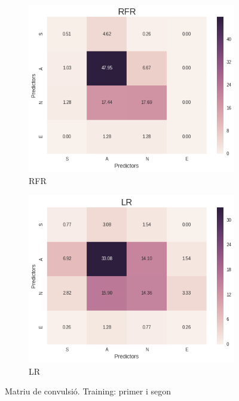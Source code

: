 \documentclass[12pt,a4paper,catalan]{article}
\begin{document}
\begin{figure}[h]
\centering
\begin{subfigure}{.42\textwidth}
  \centering
  \includegraphics[width=\linewidth]{img/heatmap_rfr_primersegon_tercer.png}
  \caption{RFR}
\end{subfigure}
\begin{subfigure}{.42\textwidth}
  \centering
  \includegraphics[width=\linewidth]{img/heatmap_lr_primersegon_tercer.png}
  \caption{LR}
\end{subfigure}
\caption{Matriu de convulsió. Training: primer i  segon}
\label{fig:mctps}
\end{figure}
\end{document}
